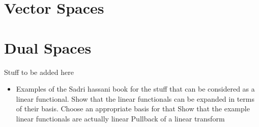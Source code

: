\section{Vector Spaces}

\section{Dual Spaces}



Stuff to be added here

\begin{itemize}
	\item Examples of the Sadri hassani book for the stuff that can be considered as a linear functional. 
	\subitem Show that the linear functionals can be expanded in terms of their basis. Choose an appropriate basis for that
	\subitem Show that the example linear functionals are actually linear 
	\subitem Pullback of a linear transform
\end{itemize}